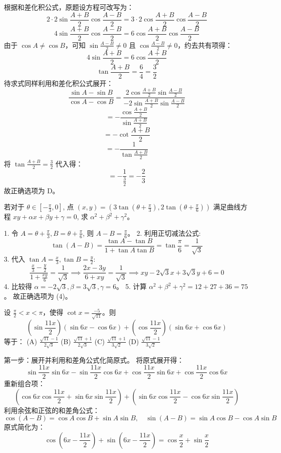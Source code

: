 \begin{questions}
\begin{solution}
根据和差化积公式，原题设方程可改写为：
\[
2 \cdot 2 \sin \frac{A+B}{2} \cos \frac{A-B}{2} = 3 \cdot 2 \cos \frac{A+B}{2} \cos \frac{A-B}{2}
\]
\[
4 \sin \frac{A+B}{2} \cos \frac{A-B}{2} = 6 \cos \frac{A+B}{2} \cos \frac{A-B}{2}
\]
由于 $\cos A \neq \cos B$，可知 $\sin \frac{A-B}{2} \neq 0$ 且 $\cos \frac{A-B}{2} \neq 0$，约去共有项得：
\[
4 \sin \frac{A+B}{2} = 6 \cos \frac{A+B}{2}
\]
\[
\tan \frac{A+B}{2} = \frac{6}{4} = \frac{3}{2}
\]
待求式同样利用和差化积公式展开：
\[
\frac{\sin A - \sin B}{\cos A - \cos B} = \frac{2 \cos \frac{A+B}{2} \sin \frac{A-B}{2}}{-2 \sin \frac{A+B}{2} \sin \frac{A-B}{2}}
\]
\[
= - \frac{\cos \frac{A+B}{2}}{\sin \frac{A+B}{2}}
\]
\[
= - \cot \frac{A+B}{2}
\]
\[
= - \frac{1}{\tan \frac{A+B}{2}}
\]
将 $\tan \frac{A+B}{2} = \frac{3}{2}$ 代入得：
\[
= - \frac{1}{\frac{3}{2}} = - \frac{2}{3}
\]
故正确选项为 D。
\end{solution}

\question
若对于 $\theta \in [-\frac{\pi}{3}, 0]$, 点 $(x, y) = (3 \tan(\theta + \frac{\pi}{3}), 2 \tan(\theta + \frac{\pi}{6}))$ 满足曲线方程 $xy + \alpha x + \beta y + \gamma = 0$, 求 $\alpha^2 + \beta^2 + \gamma^2$。

\begin{solution}
1. 令 $A = \theta + \frac{\pi}{3}, B = \theta + \frac{\pi}{6}$, 则 $A - B = \frac{\pi}{6}$。
2. 利用正切减法公式:
\[ \tan(A - B) = \frac{\tan A - \tan B}{1 + \tan A \tan B} = \tan \frac{\pi}{6} = \frac{1}{\sqrt{3}} \]
3. 代入 $\tan A = \frac{x}{3}, \tan B = \frac{y}{2}$:
\[ \frac{\frac{x}{3} - \frac{y}{2}}{1 + \frac{xy}{6}} = \frac{1}{\sqrt{3}} \implies \frac{2x - 3y}{6 + xy} = \frac{1}{\sqrt{3}} \implies xy - 2\sqrt{3}x + 3\sqrt{3}y + 6 = 0 \]
4. 比较得 $\alpha = -2\sqrt{3}, \beta = 3\sqrt{3}, \gamma = 6$。
5. 计算 $\alpha^2 + \beta^2 + \gamma^2 = 12 + 27 + 36 = 75$。
故正确选项为 (4)。
\end{solution}
\question
设 $\frac{\pi}{2} < x < \pi$，使得 $\cot x = \frac{-5}{\sqrt{11}}$。则
\[
\left( \sin \frac{11x}{2} \right) (\sin 6x - \cos 6x) + \left( \cos \frac{11x}{2} \right) (\sin 6x + \cos 6x)
\]
等于：
(A) $\frac{\sqrt{11}-1}{2\sqrt{3}}$ \quad (B) $\frac{\sqrt{11}+1}{2\sqrt{3}}$ \quad (C) $\frac{\sqrt{11}+1}{3\sqrt{2}}$ \quad (D) $\frac{\sqrt{11}-1}{3\sqrt{2}}$

\begin{solution}
第一步：展开并利用和差角公式化简原式。
将原式展开得：
\[
\sin \frac{11x}{2} \sin 6x - \sin \frac{11x}{2} \cos 6x + \cos \frac{11x}{2} \sin 6x + \cos \frac{11x}{2} \cos 6x
\]
重新组合项：
\[
\left( \cos 6x \cos \frac{11x}{2} + \sin 6x \sin \frac{11x}{2} \right) + \left( \sin 6x \cos \frac{11x}{2} - \cos 6x \sin \frac{11x}{2} \right)
\]
利用余弦和正弦的和差角公式：
\[
\cos(A-B) = \cos A \cos B + \sin A \sin B, \quad \sin(A-B) = \sin A \cos B - \cos A \sin B
\]
原式简化为：
\[
\cos\left( 6x - \frac{11x}{2} \right) + \sin\left( 6x - \frac{11x}{2} \right) = \cos \frac{x}{2} + \sin \frac{x}{2}
\]


\end{solution}
\end{questions}
